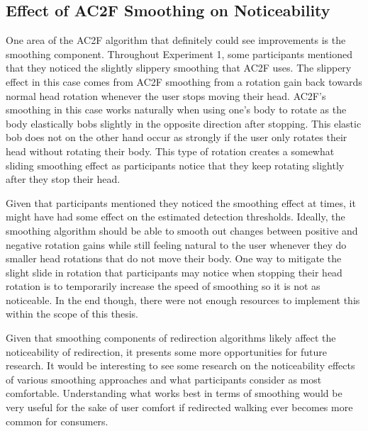 \subsection{Effect of AC2F Smoothing on Noticeability}
One area of the AC2F algorithm that definitely could see improvements is the smoothing component. Throughout Experiment 1, some participants mentioned that they noticed the slightly slippery smoothing that AC2F uses. The slippery effect in this case comes from AC2F smoothing from a rotation gain back towards normal head rotation whenever the user stops moving their head. AC2F's smoothing in this case works naturally when using one's body to rotate as the body elastically bobs slightly in the opposite direction after stopping. This elastic bob does not on the other hand occur as strongly if the user only rotates their head without rotating their body. This type of rotation creates a somewhat sliding smoothing effect as participants notice that they keep rotating slightly after they stop their head. 

Given that participants mentioned they noticed the smoothing effect at times, it might have had some effect on the estimated detection thresholds. Ideally, the smoothing algorithm should be able to smooth out changes between positive and negative rotation gains while still feeling natural to the user whenever they do smaller head rotations that do not move their body. One way to mitigate the slight slide in rotation that participants may notice when stopping their head rotation is to temporarily increase the speed of smoothing so it is not as noticeable. In the end though, there were not enough resources to implement this within the scope of this thesis. 

Given that smoothing components of redirection algorithms likely affect the noticeability of redirection, it presents some more opportunities for future research. It would be interesting to see some research on the noticeability effects of various smoothing approaches and what participants consider as most comfortable. Understanding what works best in terms of smoothing would be very useful for the sake of user comfort if redirected walking ever becomes more common for consumers. 

